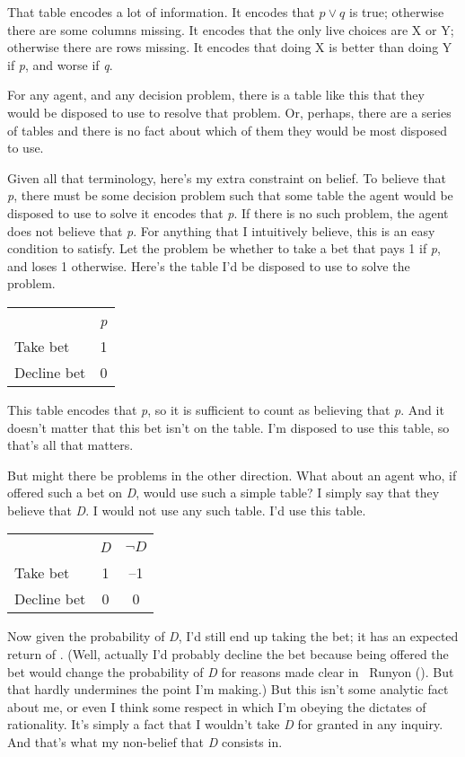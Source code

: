 \documentclass[
  11pt,
  letterpaper,
  DIV=11,
  numbers=noendperiod,
  twoside]{scrartcl}
\begin{document}
That table encodes a lot of information. It encodes that \(p \vee q\) is
true; otherwise there are some columns missing. It encodes that the only
live choices are X or Y; otherwise there are rows missing. It encodes
that doing X is better than doing Y if \emph{p}, and worse if \emph{q}.

For any agent, and any decision problem, there is a table like this that
they would be disposed to use to resolve that problem. Or, perhaps,
there are a series of tables and there is no fact about which of them
they would be most disposed to use.

Given all that terminology, here's my extra constraint on belief. To
believe that \emph{p}, there must be some decision problem such that
some table the agent would be disposed to use to solve it encodes that
\emph{p}. If there is no such problem, the agent does not believe that
\emph{p}. For anything that I intuitively believe, this is an easy
condition to satisfy. Let the problem be whether to take a bet that pays
1 if \emph{p}, and loses 1 otherwise. Here's the table I'd be disposed
to use to solve the problem.

\begin{longtable}[]{@{}lc@{}}
\toprule\noalign{}
\endhead
\bottomrule\noalign{}
\endlastfoot
& \emph{p} \\
Take bet & 1 \\
Decline bet & 0 \\
\end{longtable}

This table encodes that \emph{p}, so it is sufficient to count as
believing that \emph{p}. And it doesn't matter that this bet isn't on
the table. I'm disposed to use this table, so that's all that matters.

But might there be problems in the other direction. What about an agent
who, if offered such a bet on \emph{D}, would use such a simple table? I
simply say that they believe that \emph{D}. I would not use any such
table. I'd use this table.

\begin{longtable}[]{@{}lcc@{}}
\toprule\noalign{}
\endhead
\bottomrule\noalign{}
\endlastfoot
& \emph{D} & \(\neg D\) \\
Take bet & 1 & --1 \\
Decline bet & 0 & 0 \\
\end{longtable}

Now given the probability of \emph{D}, I'd still end up taking the bet;
it has an expected return of . (Well, actually I'd probably decline the
bet because being offered the bet would change the probability of
\emph{D} for reasons made clear in ~Runyon
(). But that hardly
undermines the point I'm making.) But this isn't some analytic fact
about me, or even I think some respect in which I'm obeying the dictates
of rationality. It's simply a fact that I wouldn't take \emph{D} for
granted in any inquiry. And that's what my non-belief that \emph{D}
consists in.
\end{document}
